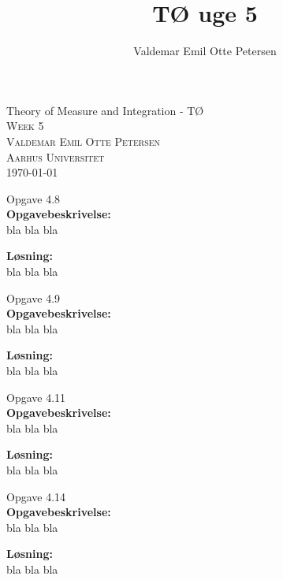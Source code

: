 \documentclass{article}
\author{Valdemar Emil Otte Petersen}
\title{TØ uge 5}
\begin{document}
\begingroup

\centering 
{\LARGE Theory of Measure and Integration - TØ}\\ %
\vspace*{1\baselineskip}
\scshape
Week 5\\ %
Valdemar Emil Otte Petersen\\ %
{\small Aarhus Universitet}\\ 
{\small \today}

\endgroup


{\LARGE Opgave 4.8}\\
\textbf{Opgavebeskrivelse:}\\
bla bla bla

\vspace{15px}
\textbf{Løsning:}\\
bla bla bla

\vspace{35px}


{\LARGE Opgave 4.9}\\
\textbf{Opgavebeskrivelse:}\\
bla bla bla

\vspace{15px}
\textbf{Løsning:}\\
bla bla bla

\vspace{35px}


{\LARGE Opgave 4.11}\\
\textbf{Opgavebeskrivelse:}\\
bla bla bla

\vspace{15px}
\textbf{Løsning:}\\
bla bla bla

\vspace{35px}


{\LARGE Opgave 4.14}\\
\textbf{Opgavebeskrivelse:}\\
bla bla bla

\vspace{15px}
\textbf{Løsning:}\\
bla bla bla

\vspace{35px}
\end{document}
